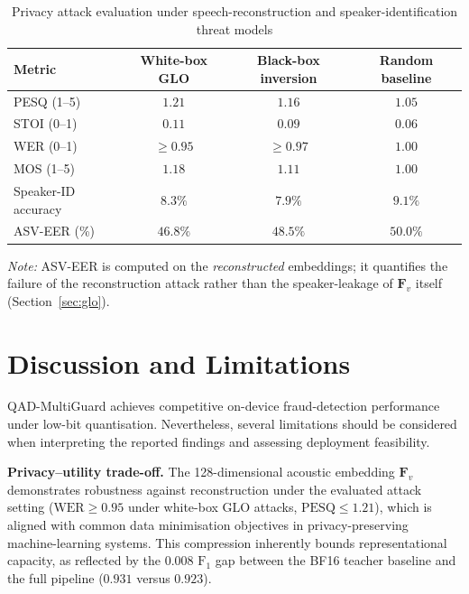 \documentclass[a4paper,fleqn]{cas-sc}
\begin{document}
\begin{table}[!t]
\centering
\caption{Privacy attack evaluation under speech-reconstruction and speaker-identification threat models}
\label{tab:privacy_attack-en}
\renewcommand{\arraystretch}{1.1}
\begin{tabular}{l c c c}
\toprule
\textbf{Metric} & \textbf{White-box GLO} & \textbf{Black-box inversion} & \textbf{Random baseline} \\
\midrule
PESQ (1--5) & $1.21$ & $1.16$ & $1.05$ \\
STOI (0--1) & $0.11$ & $0.09$ & $0.06$ \\
WER (0--1) & $\ge 0.95$ & $\ge 0.97$ & $1.00$ \\
MOS (1--5) & $1.18$ & $1.11$ & $1.00$ \\
Speaker-ID accuracy & $8.3\%$ & $7.9\%$ & $9.1\%$ \\
ASV-EER (\%) & $46.8\%$ & $48.5\%$ & $50.0\%$ \\
\bottomrule
\end{tabular}

\textit{Note:} ASV-EER is computed on the \textit{reconstructed} embeddings; it quantifies the failure of the reconstruction attack rather than the speaker-leakage of $\bm{F}_v$ itself (Section~\ref{sec:glo}).
\end{table}

\section{Discussion and Limitations}\label{sec:discussion}

QAD-MultiGuard achieves competitive on-device fraud-detection performance under low-bit quantisation. Nevertheless, several limitations should be considered when interpreting the reported findings and assessing deployment feasibility.

\textbf{Privacy--utility trade-off.}
The 128-dimensional acoustic embedding $\mathbf{F}_v$ demonstrates robustness against reconstruction under the evaluated attack setting ($\text{WER} \ge 0.95$ under white-box GLO attacks, $\text{PESQ} \le 1.21$), which is aligned with common data minimisation objectives in privacy-preserving machine-learning systems. This compression inherently bounds representational capacity, as reflected by the $0.008$ $\text{F}_1$ gap between the BF16 teacher baseline and the full pipeline ($0.931$ versus $0.923$).
\end{document}
